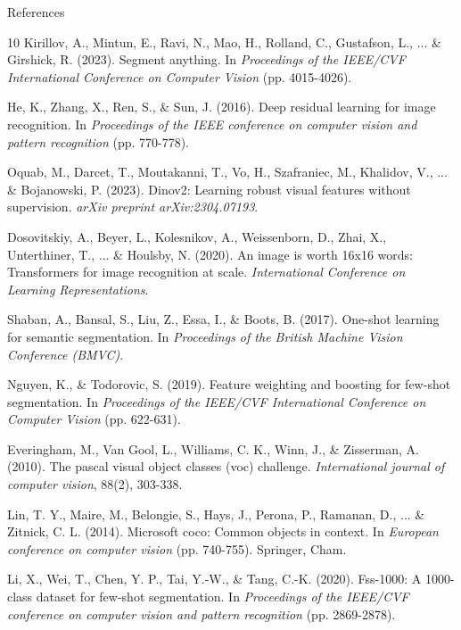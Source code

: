 \documentclass[aspectratio=169, 10pt]{beamer}
\begin{document}
\begin{frame}[allowframebreaks]{References}
    
    \begin{thebibliography}{10}
Kirillov, A., Mintun, E., Ravi, N., Mao, H., Rolland, C., Gustafson, L., ... \& Girshick, R. (2023). Segment anything. In \textit{Proceedings of the IEEE/CVF International Conference on Computer Vision} (pp. 4015-4026).

He, K., Zhang, X., Ren, S., \& Sun, J. (2016). Deep residual learning for image recognition. In \textit{Proceedings of the IEEE conference on computer vision and pattern recognition} (pp. 770-778).

Oquab, M., Darcet, T., Moutakanni, T., Vo, H., Szafraniec, M., Khalidov, V., ... \& Bojanowski, P. (2023). Dinov2: Learning robust visual features without supervision. \textit{arXiv preprint arXiv:2304.07193}.

Dosovitskiy, A., Beyer, L., Kolesnikov, A., Weissenborn, D., Zhai, X., Unterthiner, T., ... \& Houlsby, N. (2020). An image is worth 16x16 words: Transformers for image recognition at scale. \textit{International Conference on Learning Representations}.

Shaban, A., Bansal, S., Liu, Z., Essa, I., \& Boots, B. (2017). One-shot learning for semantic segmentation. In \textit{Proceedings of the British Machine Vision Conference (BMVC)}.

Nguyen, K., \& Todorovic, S. (2019). Feature weighting and boosting for few-shot segmentation. In \textit{Proceedings of the IEEE/CVF International Conference on Computer Vision} (pp. 622-631).

Everingham, M., Van Gool, L., Williams, C. K., Winn, J., \& Zisserman, A. (2010). The pascal visual object classes (voc) challenge. \textit{International journal of computer vision}, 88(2), 303-338.

Lin, T. Y., Maire, M., Belongie, S., Hays, J., Perona, P., Ramanan, D., ... \& Zitnick, C. L. (2014). Microsoft coco: Common objects in context. In \textit{European conference on computer vision} (pp. 740-755). Springer, Cham.

Li, X., Wei, T., Chen, Y. P., Tai, Y.-W., \& Tang, C.-K. (2020). Fss-1000: A 1000-class dataset for few-shot segmentation. In \textit{Proceedings of the IEEE/CVF conference on computer vision and pattern recognition} (pp. 2869-2878).


\end{thebibliography}
\end{frame}
\end{document}
